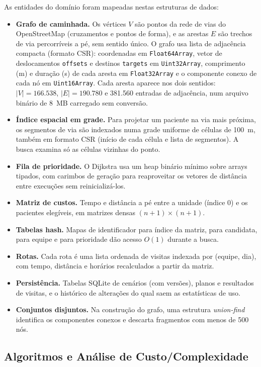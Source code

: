 \documentclass[11pt,a4paper]{article}
\begin{document}
As entidades do domínio foram mapeadas nestas estruturas de dados:
\begin{itemize}
    \item \textbf{Grafo de caminhada.} Os vértices $V$ são pontos da rede de vias do OpenStreetMap (cruzamentos e pontos de forma), e as arestas $E$ são trechos de via percorríveis a pé, sem sentido único. O grafo usa lista de adjacência compacta (formato CSR): coordenadas em \texttt{Float64Array}, vetor de deslocamentos \texttt{offsets} e destinos \texttt{targets} em \texttt{Uint32Array}, comprimento (m) e duração (s) de cada aresta em \texttt{Float32Array} e o componente conexo de cada nó em \texttt{Uint16Array}. Cada aresta aparece nos dois sentidos: $|V| = 166.538$, $|E| = 190.780$ e 381.560 entradas de adjacência, num arquivo binário de 8~MB carregado sem conversão.
    \item \textbf{Índice espacial em grade.} Para projetar um paciente na via mais próxima, os segmentos de via são indexados numa grade uniforme de células de 100~m, também em formato CSR (início de cada célula e lista de segmentos). A busca examina só as células vizinhas do ponto.
    \item \textbf{Fila de prioridade.} O Dijkstra usa um heap binário mínimo sobre arrays tipados, com carimbos de geração para reaproveitar os vetores de distância entre execuções sem reinicializá-los.
    \item \textbf{Matriz de custos.} Tempo e distância a pé entre a unidade (índice 0) e os pacientes elegíveis, em matrizes densas $(n+1)\times(n+1)$.
    \item \textbf{Tabelas hash.} Mapas de identificador para índice da matriz, para candidata, para equipe e para prioridade dão acesso $O(1)$ durante a busca.
    \item \textbf{Rotas.} Cada rota é uma lista ordenada de visitas indexada por (equipe, dia), com tempo, distância e horários recalculados a partir da matriz.
    \item \textbf{Persistência.} Tabelas SQLite de cenários (com versões), planos e resultados de visitas, e o histórico de alterações do qual saem as estatísticas de uso.
    \item \textbf{Conjuntos disjuntos.} Na construção do grafo, uma estrutura \emph{union-find} identifica os componentes conexos e descarta fragmentos com menos de 500 nós.
\end{itemize}

\subsection{Algoritmos e Análise de Custo/Complexidade}\label{sec:algoritmos}
\end{document}
